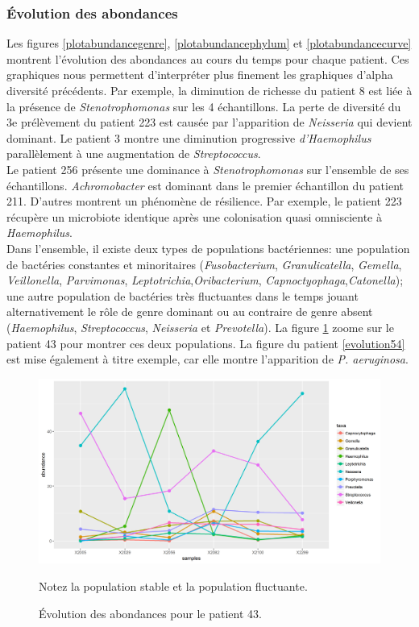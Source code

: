 \documentclass[12pt,a4paper]{article}
\begin{document}
\subsubsection{Évolution des abondances}
Les figures \ref{plotabundancegenre}, \ref{plotabundancephylum} et \ref{plotabundancecurve} montrent l’évolution des abondances au cours du temps pour chaque patient. Ces graphiques nous permettent d’interpréter plus finement les graphiques d’alpha diversité précédents.
Par exemple, la diminution de richesse du patient 8 est liée à la présence de \textit{Stenotrophomonas} sur les 4 échantillons.
La perte de diversité du 3e prélèvement du patient 223 est causée par l'apparition de \textit{Neisseria} qui devient dominant.
Le patient 3 montre une diminution progressive \textit{d’Haemophilus} parallèlement à une augmentation de \textit{Streptococcus}. \\
Le patient 256 présente une dominance à \textit{Stenotrophomonas} sur l'ensemble de ses échantillons. \textit{Achromobacter} est dominant dans le premier échantillon du patient 211.
D’autres montrent un phénomène de résilience. Par exemple, le patient 223 récupère un microbiote identique après une colonisation quasi omnisciente à \textit{Haemophilus}. \\
Dans l’ensemble, il existe deux types de populations bactériennes: une population de bactéries constantes et minoritaires (\textit{Fusobacterium}, \textit{Granulicatella}, \textit{Gemella}, \textit{Veillonella}, \textit{Parvimonas}, \textit{Leptotrichia},\textit{Oribacterium}, \textit{Capnoctyophaga},\textit{Catonella}); une autre population de bactéries très fluctuantes dans le temps jouant alternativement le rôle de genre dominant ou au contraire de genre absent (\textit{Haemophilus}, \textit{Streptococcus}, \textit{Neisseria} et \textit{Prevotella}).
La figure \ref{evolution43} zoome sur le patient 43 pour montrer ces deux populations. La figure du patient \ref{evolution54} est mise également à titre exemple, car elle montre l’apparition de \textit{P. aeruginosa}. \\

\begin{figure}
\begin{center}
\includegraphics[scale=0.60]{img/curve_043.png}\hfill
\end{center}
\caption{Évolution des abondances pour le patient 43.}
Notez la population stable et la population fluctuante.
\label{evolution43}
\end{figure}
\end{document}
